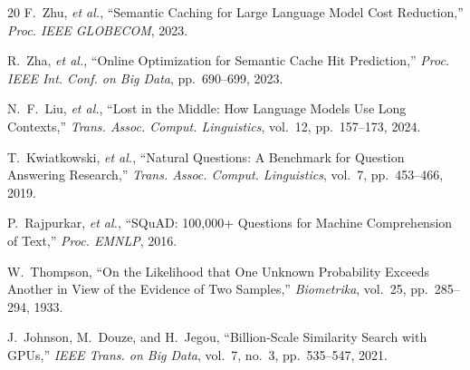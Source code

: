 \documentclass[conference]{IEEEtran}
\begin{document}
\begin{thebibliography}{20}
F.~Zhu, \emph{et al.}, ``Semantic Caching for Large Language Model Cost Reduction,'' \emph{Proc. IEEE GLOBECOM}, 2023.

R.~Zha, \emph{et al.}, ``Online Optimization for Semantic Cache Hit Prediction,'' \emph{Proc. IEEE Int. Conf. on Big Data}, pp.~690--699, 2023.

N.~F.~Liu, \emph{et al.}, ``Lost in the Middle: How Language Models Use Long Contexts,'' \emph{Trans. Assoc. Comput. Linguistics}, vol.~12, pp.~157--173, 2024.

T.~Kwiatkowski, \emph{et al.}, ``Natural Questions: A Benchmark for Question Answering Research,'' \emph{Trans. Assoc. Comput. Linguistics}, vol.~7, pp.~453--466, 2019.

P.~Rajpurkar, \emph{et al.}, ``SQuAD: 100,000+ Questions for Machine Comprehension of Text,'' \emph{Proc. EMNLP}, 2016.

W.~Thompson, ``On the Likelihood that One Unknown Probability Exceeds Another in View of the Evidence of Two Samples,'' \emph{Biometrika}, vol.~25, pp.~285--294, 1933.

J.~Johnson, M.~Douze, and H.~Jegou, ``Billion-Scale Similarity Search with GPUs,'' \emph{IEEE Trans. on Big Data}, vol.~7, no.~3, pp.~535--547, 2021.

\end{thebibliography}
\end{document}
